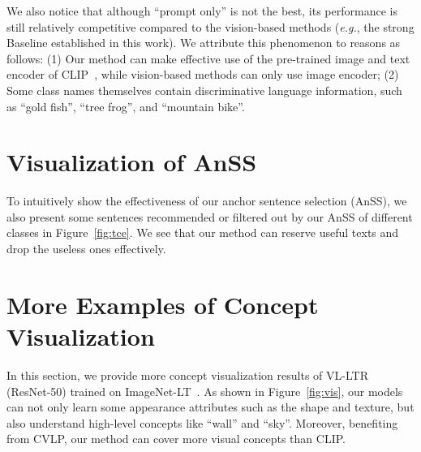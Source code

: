 \documentclass[runningheads]{llncs}
\def\eg{\emph{e.g.}}
\begin{document}
We also notice that although ``prompt only'' is not the best, its performance is still relatively competitive compared to the vision-based methods (\eg, the strong Baseline established in this work).
We attribute this phenomenon to reasons as follows: (1) Our method can make effective use of the pre-trained image and text encoder of CLIP~\cite{clip}, while vision-based methods can only use image encoder;
(2) Some class names themselves contain discriminative language information, such as ``gold fish'', ``tree frog'', and ``mountain bike''.

\section{Visualization of AnSS}

To intuitively show the effectiveness of our anchor sentence selection (AnSS), we also present some sentences recommended or filtered out by our AnSS of different classes in Figure~\ref{fig:tce}. We see that our method can reserve useful texts and drop the useless ones effectively.


\section{More Examples of Concept Visualization}

In this section, we provide more concept visualization results of VL-LTR (ResNet-50) trained on ImageNet-LT~\cite{liu2019large}. As shown in Figure~\ref{fig:vis}, our models can not only learn some appearance attributes such as the shape and texture, but also understand high-level concepts like ``wall'' and ``sky''. 
Moreover, benefiting from CVLP, our method can cover more visual concepts than CLIP.

\begin{figure*}[t]
		\centering
		\setlength{\fboxrule}{0pt}
		\caption{
		\textbf{Some ``good'' and ``bad'' sentences and their corresponding  of classes in ImageNet-LT~\cite{liu2019large}.}
		The value of  can reflect the usefulness of these sentences to some extent, which thereby supports the effectiveness of our AnSS.
		}
		\label{fig:tce}
\end{figure*}

\begin{figure*}[t]
\centering
		\setlength{\fboxrule}{0pt}
\caption{
		\textbf{Examples of concept visualization.} Our method can not only learn the texture (\eg, mesh) and shape (\eg, linear) of objects, but can also understand some visual attributes (\eg, fur and fin) and high-level concepts (\eg, wall and sky).
		In addition, compared to the original CLIP~\cite{clip}, our method can cover more visual concepts.
		}
		\label{fig:vis}
\end{figure*}

%
 
\end{document}
